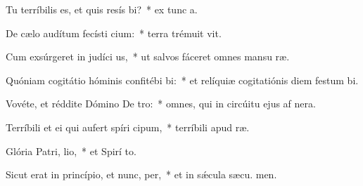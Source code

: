\item Tu terríbilis es, et quis resís bi?~* ex tunc  a.
\item De cælo audítum fecísti cium:~* terra trémuit  vit.
\item Cum exsúrgeret in judíci us,~* ut salvos fáceret omnes mansu ræ.
\item Quóniam cogitátio hóminis confitébi bi:~* et relíquiæ cogitatiónis diem festum  bi.
\item Vovéte, et réddite Dómino De tro:~* omnes, qui in circúitu ejus af nera.
\item Terríbili et ei qui aufert spíri cipum,~* terríbili apud  ræ.
\item Glória Patri,  lio,~* et Spirí to.
\item Sicut erat in princípio, et nunc,  per,~* et in sǽcula sæcu. men.
